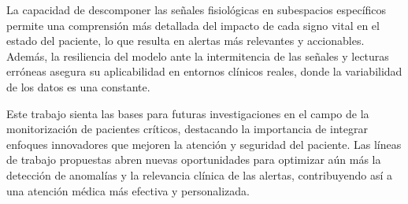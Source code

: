 La capacidad de descomponer las señales fisiológicas en subespacios específicos permite una comprensión más detallada del impacto de cada signo vital en el estado del paciente, lo que resulta en alertas más relevantes y accionables. Además, la resiliencia del modelo ante la intermitencia de las señales y lecturas erróneas asegura su aplicabilidad en entornos clínicos reales, donde la variabilidad de los datos es una constante.

Este trabajo sienta las bases para futuras investigaciones en el campo de la monitorización de pacientes críticos, destacando la importancia de integrar enfoques innovadores que mejoren la atención y seguridad del paciente. Las líneas de trabajo propuestas abren nuevas oportunidades para optimizar aún más la detección de anomalías y la relevancia clínica de las alertas, contribuyendo así a una atención médica más efectiva y personalizada.